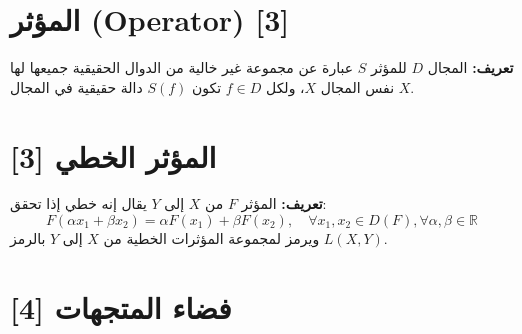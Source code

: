 	\section{المؤثر (Operator) [3]}
	
	\textbf{تعريف:}  
	المجال \( D \) للمؤثر \( S \) عبارة عن مجموعة غير خالية من الدوال الحقيقية جميعها لها نفس المجال \( X \)، ولكل \( f \in D \) تكون \( S(f) \) دالة حقيقية في المجال \( X \).
	
%	
	
	\section{المؤثر الخطي  [3]}
	
	\textbf{تعريف:}  
	المؤثر \( F \) من \( X \) إلى \( Y \) يقال إنه خطي إذا تحقق:
	\[
	F(\alpha x_1 + \beta x_2) = \alpha F(x_1) + \beta F(x_2), \quad \forall x_1, x_2 \in D(F), \forall \alpha, \beta \in \mathbb{R}
	\]
	ويرمز لمجموعة المؤثرات الخطية من \( X \) إلى \( Y \) بالرمز \( L(X,Y) \).
	
	\section{فضاء المتجهات  [4]}
	
